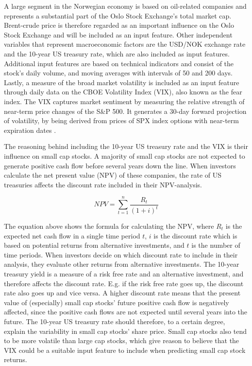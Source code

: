 \indent\newline
A large segment in the Norwegian economy is based on oil-related companies and represents a substantial part of the Oslo Stock Exchange's total market cap. Brent-crude price is therefore regarded as an important influence on the Oslo Stock Exchange and will be included as an input feature. Other independent variables that represent macroeconomic factors are the USD/NOK exchange rate and the 10-year US treasury rate, which are also included as input features. Additional input features are based on technical indicators and consist of the stock's daily volume, and moving averages with intervals of 50 and 200 days. Lastly, a measure of the broad market volatility is included as an input feature through daily data on the CBOE Volatility Index (VIX), also known as the fear index. The VIX captures market sentiment by measuring the relative strength of near-term price changes of the S\&P 500. It generates a 30-day forward projection of volatility, by being derived from prices of SPX index options with near-term expiration dates \cite{kuepper2021}.

\indent\newline
The reasoning behind including the 10-year US treasury rate and the VIX is their influence on small cap stocks. A majority of small cap stocks are not expected to generate positive cash flow before several years down the line. When investors calculate the net present value (NPV) of these companies, the rate of US treasuries affects the discount rate included in their NPV-analysis. 

\indent\newline
\begin{equation}
NPV = \sum_{t=1}^{n} \frac{R_{t}}{(1 + i)^{t}}
\end{equation}

\indent\newline
The equation above shows the formula for calculating the NPV, where $R_{t}$ is the expected net cash flow in a single time period $\textit{t}$, $\textit{i}$ is the discount rate which is based on potential returns from alternative investments, and $\textit{t}$ is the number of time periods. When investors decide on which discount rate to include in their analysis, they evaluate other returns from alternative investments. The 10-year treasury yield is a measure of a risk free rate and an alternative investment, and therefore affects the discount rate. E.g. if the risk free rate goes up, the discount rate also goes up and vice versa. A higher discount rate means that the present value of (especially) small cap stocks' future positive cash flow is negatively affected, since the positive cash flows are not expected until several years into the future. The 10-year US treasury rate should therefore, to a certain degree, explain the variability in small cap stocks' share price. Small cap stocks also tend to be more volatile than large cap stocks, which give reason to believe that the VIX could be a suitable input feature to include when predicting small cap stock returns. 


